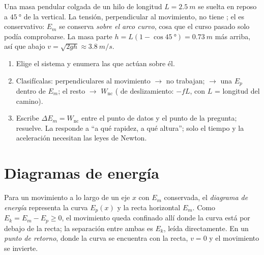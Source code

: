 \begin{example}\label{ex:g12:work-and-energy:pendulum}
Una masa pendular colgada de un hilo de longitud $L = \qty{2.5}{m}$ se suelta en
reposo a $\qty{45}{\degree}$ de la vertical. La tensión, perpendicular al movimiento,
no tiene ; el  es conservativo: $E_m$ se conserva \emph{sobre el arco
curvo}, cosa que el curso pasado solo podía comprobarse. La masa parte $h = L(1 -
\cos\qty{45}{\degree}) = \qty{0.73}{m}$ más arriba, así que abajo
$v = \sqrt{2gh} \approx \qty{3.8}{m/s}$.
\end{example}

\begin{method}\label{met:g12:work-and-energy:audit}
\begin{enumerate}
  \item Elige el sistema y enumera las  que actúan sobre él.
  \item Clasifícalas: perpendiculares al movimiento $\to$ no trabajan; 
        $\to$ una $E_p$ dentro de $E_m$; el resto $\to$ $W_{\text{nc}}$ ( de
        deslizamiento: $-fL$, con $L$ = longitud del camino).
  \item Escribe $\Delta E_m = W_{\text{nc}}$ entre el punto de datos y el punto de la
        pregunta; resuelve. La  responde a ``a qué rapidez, a qué altura'';
        solo el tiempo y la aceleración necesitan las leyes de Newton.
\end{enumerate}
\end{method}

\section{Diagramas de energía}

\begin{definition}\label{def:g12:work-and-energy:diagram}
Para un movimiento a lo largo de un eje $x$ con $E_m$ conservada, el \emph{diagrama de
energía} representa la curva $E_p(x)$ y la recta horizontal
$E_m$. Como $E_k = E_m - E_p \geq 0$, el movimiento queda confinado allí donde la
curva está por debajo de la recta; la separación entre ambas es $E_k$, leída
directamente. En un \emph{punto de retorno}, donde la curva se
encuentra con la recta, $v = 0$ y el movimiento se invierte.
\end{definition}

